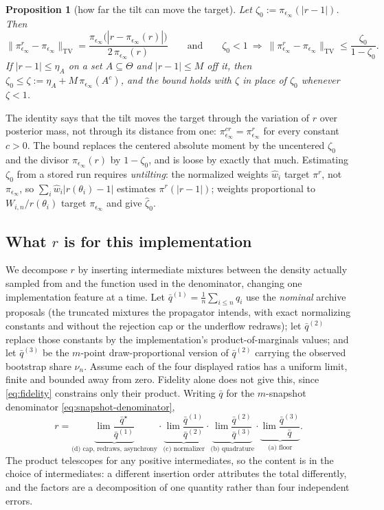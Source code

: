 \documentclass[10pt]{article}
\theoremstyle{plain}
\newtheorem{proposition}[theorem]{Proposition}
\theoremstyle{definition}
\begin{document}
\begin{proposition}[how far the tilt can move the target]\label{prop:tilt}
Let $\zeta_0:=\pi_{\epsilon_\infty}(|r-1|)$. Then
\begin{equation}
\bigl\|\pi^r_{\epsilon_\infty}-\pi_{\epsilon_\infty}\bigr\|_{\mathrm{TV}}
=\frac{\pi_{\epsilon_\infty}\bigl(|r-\pi_{\epsilon_\infty}(r)|\bigr)}{2\,\pi_{\epsilon_\infty}(r)}
\qquad\text{and}\qquad
\zeta_0<1\ \Longrightarrow\ \bigl\|\pi^r_{\epsilon_\infty}-\pi_{\epsilon_\infty}\bigr\|_{\mathrm{TV}}\le\frac{\zeta_0}{1-\zeta_0}.
\label{eq:tilt-bound}
\end{equation}
If $|r-1|\le\eta_A$ on a set $A\subseteq\Theta$ and $|r-1|\le M$ off it, then $\zeta_0\le\zeta:=\eta_A+M\,\pi_{\epsilon_\infty}(A^c)$, and the bound holds with $\zeta$ in place of $\zeta_0$ whenever $\zeta<1$.
\end{proposition}
The identity says that the tilt moves the target through the variation of $r$ over posterior mass, not through its distance from one: $\pi^{cr}_{\epsilon_\infty}=\pi^r_{\epsilon_\infty}$ for every constant $c>0$. The bound replaces the centered absolute moment by the uncentered $\zeta_0$ and the divisor $\pi_{\epsilon_\infty}(r)$ by $1-\zeta_0$, and is loose by exactly that much. Estimating $\zeta_0$ from a stored run requires \emph{untilting}: the normalized weights $\widehat w_i$ target $\pi^r$, not $\pi_{\epsilon_\infty}$, so $\sum_i\widehat w_i|r(\theta_i)-1|$ estimates $\pi^r(|r-1|)$; weights proportional to $W_{i,n}/r(\theta_i)$ target $\pi_{\epsilon_\infty}$ and give $\widehat\zeta_0$.

\subsection{What $r$ is for this implementation}\label{sec:theory-r}
We decompose $r$ by inserting intermediate mixtures between the density actually sampled from and the function used in the denominator, changing one implementation feature at a time. Let $\bar q^{(1)}=\tfrac1n\sum_{i\le n}q_i$ use the \emph{nominal} archive proposals (the truncated mixtures the propagator intends, with exact normalizing constants and without the rejection cap or the underflow redraws); let $\bar q^{(2)}$ replace those constants by the implementation's product-of-marginals values; and let $\bar q^{(3)}$ be the $m$-point draw-proportional version of $\bar q^{(2)}$ carrying the observed bootstrap share $\nu_n$. Assume each of the four displayed ratios has a uniform limit, finite and bounded away from zero. Fidelity alone does not give this, since \eqref{eq:fidelity} constrains only their product. Writing $\bar q$ for the $m$-snapshot denominator \eqref{eq:snapshot-denominator},
\[
r=\underbrace{\lim\frac{\bar q^\star}{\bar q^{(1)}}}_{\text{(d) cap, redraws, asynchrony}}\cdot
\underbrace{\lim\frac{\bar q^{(1)}}{\bar q^{(2)}}}_{\text{(c) normalizer}}\cdot
\underbrace{\lim\frac{\bar q^{(2)}}{\bar q^{(3)}}}_{\text{(b) quadrature}}\cdot
\underbrace{\lim\frac{\bar q^{(3)}}{\bar q}}_{\text{(a) floor}} .
\]
The product telescopes for any positive intermediates, so the content is in the choice of intermediates: a different insertion order attributes the total differently, and the factors are a decomposition of one quantity rather than four independent errors.
\end{document}
